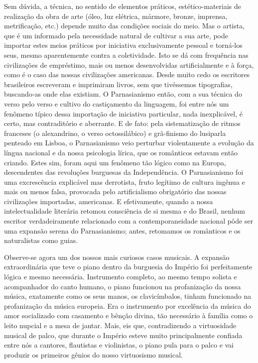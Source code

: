 Sem dúvida, a técnica, no sentido de elementos práticos,
estético-materiais de realização da obra de arte (óleo, luz elétrica,
mármore, bronze, imprensa, metrificação, etc.) depende muito das
condições sociais do meio. Mas o artista, que é um informado pela
necessidade natural de cultivar a sua arte, pode importar estes meios
práticos por iniciativa exclusivamente pessoal e torná-los seus, mesmo
aparentemente contra a coletividade. Isto se dá com frequência nas
civilizações de empréstimo, mais ou menos desenvolvidas artificialmente
e à força, como é o caso das nossas civilizações americanas. Desde muito
cedo os escritores brasileiros escreveram e imprimiram livros, sem que
tivéssemos tipografias, buscando-as onde elas existiam. O Parnasianismo
então, com a sua técnica do verso pelo verso e cultivo do castiçamento
da linguagem, foi entre nós um fenômeno típico dessa importação de
iniciativa particular, nada inexplicável, é certo, mas contraditório e
aberrante. E de fato: pela sistematização de ritmos franceses (o
alexandrino, o verso octossilábico) e grã-finismo do lusiparla penteado
em Lisboa, o Parnasianismo veio perturbar violentamente a evolução da
língua nacional e da nossa psicologia lírica, que os românticos estavam
então criando. Estes sim, foram aqui um fenômeno tão lógico como na
Europa, descendentes das revoluções burguesas da Independência. O
Parnasianismo foi uma excrescência explicável mas derrotista, fruto
legítimo de cultura ingênua e mais ou menos falsa, provocada pelo
artificialismo obrigatório das nossas civilizações importadas,
americanas. E efetivamente, quando a nossa intelectualidade literária
retomou consciência de si mesma e do Brasil, nenhum escritor
verdadeiramente relacionado com a contemporaneidade nacional pôde ser
uma expansão serena do Parnasianismo; antes, retomamos os românticos e
os naturalistas como guias.

Observe-se agora um dos nossos mais curiosos casos musicais. A expansão
extraordinária que teve o piano dentro da burguesia do Império foi
perfeitamente lógica e mesmo necessária. Instrumento completo, ao mesmo
tempo solista e acompanhador do canto humano, o piano funcionou na
profanização da nossa música, exatamente como os seus manos, os
clavicímbalos, tinham funcionado na profanização da música europeia. Era
o instrumento por excelência da música do amor socializado com casamento
e bênção divina, tão necessário à família como o leito nupcial e a mesa
de jantar. Mais, eis que, contradizendo a virtuosidade musical de palco,
que durante o Império esteve muito principalmente confiada entre nós a
cantores, flautistas e violinistas, o piano pula para o palco e vai
produzir os primeiros gênios do nosso virtuosismo musical.

